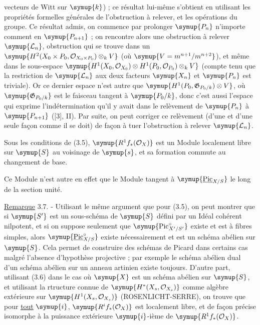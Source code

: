 vecteurs de Witt sur $\symup{k}$) ; ce résultat lui-même s'obtient en utilisant les
propriétés formelles générales de l'obstruction à relever, et les opérations du
groupe. Ce résultat admis, on commence par prolonger $\symup{P_n}$ n'importe comment en
$\symup{P_{n+1}}$ ; on rencontre alors une obstruction à relever $\symup{\mathcal L_n}$,
obstruction qui se trouve dans un $\symup{H^2(X_0\times P_0,\mathcal O_{X_0\times P_0})\otimes_k V}$
(où $\symup{V=m^{n+1}/m^{n+2}}$), et même dans le sous-espace
$\symup{H^1(X_0,\mathcal O_{X_0})\otimes H^1(P_0,\mathcal O_{P_0})\otimes_k V}$
(compte tenu que la restriction de $\symup{\mathcal L_n}$ aux deux facteurs $\symup{X_n}$ et
$\symup{P_n}$ est triviale). Or ce dernier espace n'est autre que $\symup{H^1(P_0,\mathfrak G_{P_0/k})\otimes V}$, où $\symup{\mathfrak G_{P_0/k}}$ est le faisceau tangent à $\symup{P_0/k}$, donc c'est aussi
l'espace qui exprime l'indétermination qu'il y avait dans le relèvement de
$\symup{P_n}$ à $\symup{P_{n+1}}$ ([3], II). Par suite, on peut corriger ce relèvement (d'une
et d'une seule façon comme il se doit) de façon à tuer l'obstruction à relever
$\symup{\mathcal L_n}$.

 Sous les conditions de (3.5),
$\symup{R^1f_*(\mathcal O_X)}$ est un Module localement libre sur $\symup{S}$ au voisinage de
$\symup{s}$, et sa formation commute au changement de base.

Ce Module n'est autre en effet que le Module tangent à
$\symup{\underline{\operatorname{Pic}}_{X/S}}$ le long de la section unité.

\noindent\uline{Remarque} 3.7. - Utilisant le même argument que pour (3.5), on peut
montrer que si $\symup{S'}$ est un sous-schéma de $\symup{S}$ défini par un Idéal cohérent
nilpotent, et si on suppose seulement que
$\symup{\operatorname{Pic}_{X'/S'}^\circ}$ existe et est à fibres simples, alors
$\symup{\underline{\operatorname{Pic}}_{X/S}^\circ}$ existe nécessairement et est un schéma
abélien sur $\symup{S}$. Cela permet de construire des schémas de Picard dans certains
cas malgré l'absence d'hypothèse projective ; par exemple le schéma abélien
dual d'un schéma abélien sur un anneau artinien existe toujours. D'autre part,
utilisant (3.6) dans le cas où $\symup{X}$ est un schéma abélien sur $\symup{S}$, et utilisant
la rtructure connue de $\symup{H^*(X_s,\mathcal O_{X_s})}$ comme algèbre extérieure
sur $\symup{H^1(X_s,\mathcal O_{X_s})}$ (ROSENLICHT-SERRE), on trouve que pour \uline{tout}
$\symup{i}$, $\symup{R^if_*(\mathcal O_X)}$ est localement libre, et de façon précise isomorphe
à la puissance extérieure $\symup{i}$-ième de $\symup{R^1f_*(\mathcal O_X)}$.

